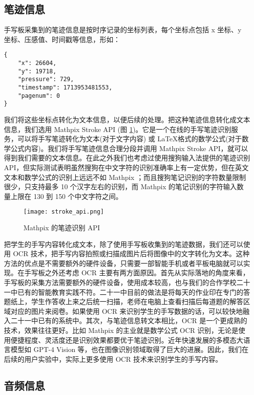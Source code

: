 \subsection*{笔迹信息}

手写板采集到的笔迹信息是按时序记录的坐标列表，每个坐标点包括 x 坐标、y 坐标、压感值、时间戳等信息，形如：

\begin{verbatim}
{
    "x": 26604, 
    "y": 19718, 
    "pressure": 729, 
    "timestamp": 1713953481553, 
    "pagenum": 0
}
\end{verbatim}

我们将这些坐标点转化为文本信息，以便后续的处理。把这种笔迹信息转化成文本信息，我们选用 Mathpix Stroke API (图 \ref{fig:stroke_api})。它是一个在线的手写笔迹识别服务，可以将手写笔迹转化为文本(对于文字内容) 或 \LaTeX 格式的数学公式(对于数学公式内容)。我们将手写笔迹信息合理分段并调用 Mathpix Stroke API，就可以得到我们需要的文本信息。在此之外我们也考虑过使用搜狗输入法提供的笔迹识别 API，但实际测试表明虽然搜狗在中文字符的识别准确率上有一定优势，但在英文文本和数学公式的识别上远远不如 Mathpix ；而且搜狗笔记识别的字符数量限制很少，只支持最多 10 个汉字左右的识别，而 Mathpix 的笔记识别的字符输入数量上限在 130 到 150 个中文字符之间。

\begin{figure}
    \centering
    \texttt{[image: stroke\_api.png]}
    \caption{Mathpix 的笔迹识别 API}
    \label{fig:stroke_api}
\end{figure}

把学生的手写内容转化成文本，除了使用手写板收集到的笔迹数据，我们还可以使用 OCR 技术，把手写内容拍照或扫描成图片后将图像中的文字转化为文本。这种方法的优点是不需要额外的硬件设备，只需要一部智能手机或者平板电脑就可以实现。在手写板之外还考虑 OCR 主要有两方面原因。首先从实际落地的角度来看，手写板的采集方法需要额外的硬件设备，使用成本较高，也与我们的合作学校二十一中已有的智能教育实践不符。二十一中目前的做法是将每天的作业印在专门的答题纸上，学生作答收上来之后统一扫描，老师在电脑上查看扫描后每道题的解答区域对应的图片来阅卷。如果使用 OCR 来识别学生的手写数据的话，可以较快地融入二十一中已有的系统中。其次，与笔迹信息转文本相比，OCR 是一个更成熟的技术，效果往往更好。比如 Mathpix 的主业就是数学公式 OCR 识别，无论是使用便捷程度、灵活度还是识别效果都要优于笔迹识别。近年快速发展的多模态大语言模型如 GPT-4 Vision 等，也在图像识别领域取得了巨大的进展。因此，我们在后续的用户实验中，实际上更多使用 OCR 技术来识别学生的手写内容。

\subsection*{音频信息}


